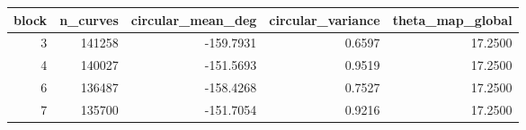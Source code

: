 \begin{tabular}{rrrrr}
\toprule
block & n_curves & circular_mean_deg & circular_variance & theta_map_global \\
\midrule
3 & 141258 & -159.7931 & 0.6597 & 17.2500 \\
4 & 140027 & -151.5693 & 0.9519 & 17.2500 \\
6 & 136487 & -158.4268 & 0.7527 & 17.2500 \\
7 & 135700 & -151.7054 & 0.9216 & 17.2500 \\
\bottomrule
\end{tabular}
